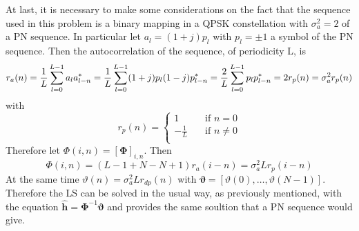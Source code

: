 \documentclass[10pt]{article}
\begin{document}
At last, it is necessary to make some considerations on the fact that the sequence used in this problem is a binary mapping in a QPSK constellation with $\sigma_a^2 = 2$ of a PN sequence. In particular let $a_l = (1+j) p_l$ with $p_l = \pm 1$ a symbol of the PN sequence. Then the autocorrelation of the sequence, of periodicity L, is
\begin{equation}
	r_a(n) = \frac{1}{L}\sum_{l = 0}^{L-1} a_l a^*_{l-n} = \\
	\frac{1}{L}\sum_{l = 0}^{L-1} (1+j)p_l (1-j)p^*_{l-n} = 
	\frac{2}{L} \sum_{l= 0}^{L-1} p_l p^*_{l-n} = 2 r_p(n) = \sigma_a^2 r_p(n)
\end{equation}
with 
\begin{equation}
	r_p(n) = 
  	\begin{cases}
    1       & \quad \text{if } n =0 \\
    -\frac{1}{L}  & \quad \text{if } n \neq 0 \\
  \end{cases}
\end{equation}
Therefore let $\Phi(i, n) = [\mathbf{\Phi}]_{i, n}$. Then
\begin{equation}
	\Phi(i, n) = (L -1 + N - N + 1)r_a(i-n) = \sigma_a^2 Lr_p(i-n)
\end{equation}
At the same time $\vartheta(n) = \sigma_a^2 Lr_{dp}(n)$ with $\boldsymbol{\vartheta} = [\vartheta(0), \dots, \vartheta(N-1)]$.
Therefore the LS can be solved in the usual way, as previously mentioned, with the equation $\hat{\mathbf{h}}= \mathbf{\Phi}^{-1} \boldsymbol{\vartheta}$ and provides the same soultion that a PN sequence would give. 
\end{document}
